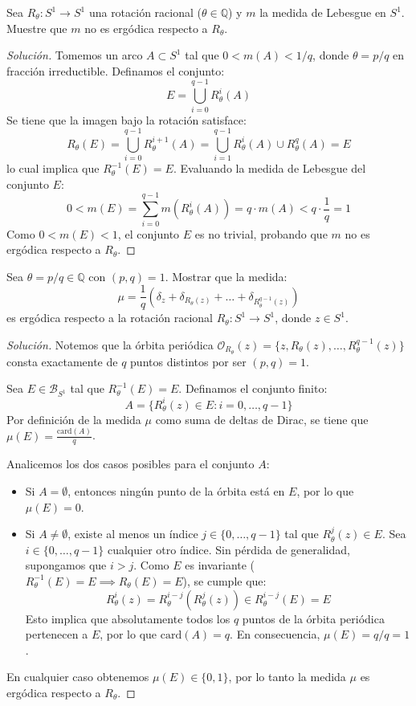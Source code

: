 \begin{ejercicio}
	Sea $R_\theta: S^1 \to S^1$ una rotación racional ($\theta \in \mathbb{Q}$) y $m$ la medida de Lebesgue en $S^1$. Muestre que $m$ no es ergódica respecto a $R_\theta$.
\end{ejercicio}
\begin{proof}[Solución]
	Tomemos un arco $A \subset S^1$ tal que $0 < m(A) < 1/q$, donde $\theta = p/q$ en fracción irreductible. Definamos el conjunto:
	$$ E = \bigcup_{i=0}^{q-1} R_\theta^i(A) $$
	Se tiene que la imagen bajo la rotación satisface:
	$$ R_\theta(E) = \bigcup_{i=0}^{q-1} R_\theta^{i+1}(A) = \bigcup_{i=1}^{q-1} R_\theta^i(A) \cup R_\theta^q(A) = E $$
	lo cual implica que $R_\theta^{-1}(E) = E$.
	Evaluando la medida de Lebesgue del conjunto $E$:
	$$ 0 < m(E) = \sum_{i=0}^{q-1} m(R_\theta^i(A)) = q \cdot m(A) < q \cdot \frac{1}{q} = 1 $$
	Como $0 < m(E) < 1$, el conjunto $E$ es no trivial, probando que $m$ no es ergódica respecto a $R_\theta$.
\end{proof}

\begin{ejercicio}
	Sea $\theta = p/q \in \mathbb{Q}$ con $(p,q)=1$. Mostrar que la medida:
	$$ \mu = \frac{1}{q} \left( \delta_z + \delta_{R_\theta(z)} + \dots + \delta_{R_\theta^{q-1}(z)} \right) $$
	es ergódica respecto a la rotación racional $R_\theta: S^1 \to S^1$, donde $z \in S^1$.
\end{ejercicio}
\begin{proof}[Solución]
	Notemos que la órbita periódica $\mathcal{O}_{R_\theta}(z) = \{z, R_\theta(z), \dots, R_\theta^{q-1}(z)\}$ consta exactamente de $q$ puntos distintos por ser $(p,q)=1$.
	
	Sea $E \in \mathcal{B}_{S^1}$ tal que $R_\theta^{-1}(E) = E$. Definamos el conjunto finito:
	$$ A = \{R_\theta^i(z) \in E : i = 0, \dots, q-1\} $$
	Por definición de la medida $\mu$ como suma de deltas de Dirac, se tiene que $\mu(E) = \frac{\text{card}(A)}{q}$.
	
	Analicemos los dos casos posibles para el conjunto $A$:
	\begin{itemize}
		\item Si $A = \emptyset$, entonces ningún punto de la órbita está en $E$, por lo que $\mu(E) = 0$.
		\item Si $A \neq \emptyset$, existe al menos un índice $j \in \{0, \dots, q-1\}$ tal que $R_\theta^j(z) \in E$.
		Sea $i \in \{0, \dots, q-1\}$ cualquier otro índice. Sin pérdida de generalidad, supongamos que $i > j$. Como $E$ es invariante ($R_\theta^{-1}(E) = E \implies R_\theta(E) = E$), se cumple que:
		$$ R_\theta^i(z) = R_\theta^{i-j}(R_\theta^j(z)) \in R_\theta^{i-j}(E) = E $$
		Esto implica que absolutamente todos los $q$ puntos de la órbita periódica pertenecen a $E$, por lo que $\text{card}(A) = q$. En consecuencia, $\mu(E) = q/q = 1$.
	\end{itemize}
	En cualquier caso obtenemos $\mu(E) \in \{0, 1\}$, por lo tanto la medida $\mu$ es ergódica respecto a $R_\theta$.
\end{proof}

